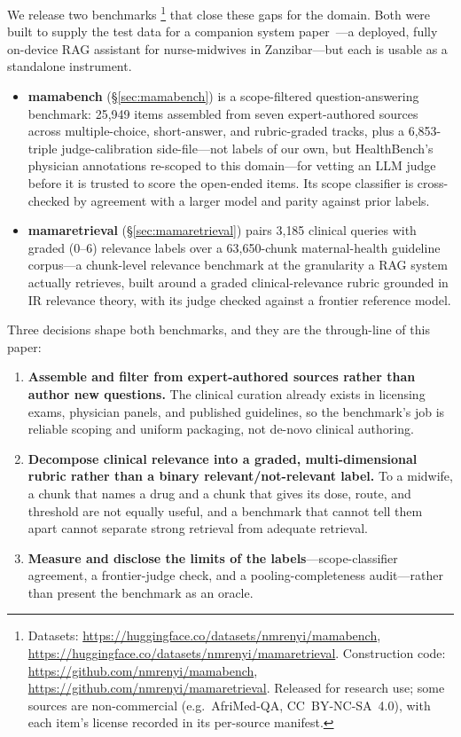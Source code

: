 We release two benchmarks%
\footnote{Datasets: \url{https://huggingface.co/datasets/nmrenyi/mamabench},
\url{https://huggingface.co/datasets/nmrenyi/mamaretrieval}. Construction code:
\url{https://github.com/nmrenyi/mamabench},
\url{https://github.com/nmrenyi/mamaretrieval}. Released for research use; some
sources are non-commercial (e.g.\ AfriMed-QA, CC~BY-NC-SA~4.0), with each item's
license recorded in its per-source manifest.}
that close these gaps for the domain. Both were built
to supply the test data for a companion system paper~\cite{ren2026mamai}---a
deployed, fully on-device RAG assistant for nurse-midwives in Zanzibar---but
each is usable as a standalone instrument.
\begin{itemize}
  \item \textbf{mamabench} (\S\ref{sec:mamabench}) is a scope-filtered
  question-answering benchmark: 25{,}949 items assembled from seven
  expert-authored sources across multiple-choice, short-answer, and
  rubric-graded tracks, plus a 6{,}853-triple judge-calibration side-file---not
  labels of our own, but HealthBench's physician annotations re-scoped to this
  domain---for vetting an LLM judge before it is trusted to score the open-ended
  items. Its scope classifier is cross-checked by agreement with a larger model
  and parity against prior labels.
  \item \textbf{mamaretrieval} (\S\ref{sec:mamaretrieval}) pairs 3{,}185 clinical
  queries with graded ($0$--$6$) relevance labels over a 63{,}650-chunk
  maternal-health guideline corpus---a chunk-level relevance benchmark at the
  granularity a RAG system actually retrieves, built around a graded
  clinical-relevance rubric grounded in IR relevance theory, with its judge
  checked against a frontier reference model.
\end{itemize}

Three decisions shape both benchmarks, and they are the through-line of this
paper:
\begin{enumerate}
  \item \textbf{Assemble and filter from expert-authored sources rather than
  author new questions.} The clinical curation already exists in licensing
  exams, physician panels, and published guidelines, so the benchmark's job is
  reliable scoping and uniform packaging, not de-novo clinical authoring.
  \item \textbf{Decompose clinical relevance into a graded, multi-dimensional
  rubric rather than a binary relevant/not-relevant label.} To a midwife, a
  chunk that names a drug and a chunk that gives its dose, route, and threshold
  are not equally useful, and a benchmark that cannot tell them apart cannot
  separate strong retrieval from adequate retrieval.
  \item \textbf{Measure and disclose the limits of the labels}---scope-classifier
  agreement, a frontier-judge check, and a pooling-completeness audit---rather
  than present the benchmark as an oracle.
\end{enumerate}

